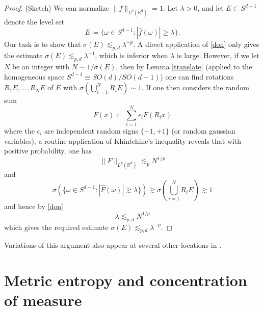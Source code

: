 \documentclass[12pt,a4paper,reqno]{amsart}
\numberwithin{equation}{section}
\theoremstyle{plain}
\theoremstyle{definition}
\newcommand\R{\mathbb{R}}
\begin{document}
\begin{proof}  (Sketch) We can normalize $\|f\|_{L^p(\R^d)}=1$.  Let $\lambda > 0$, and let $E \subset S^{d-1}$ denote the level set
$$ E \coloneqq  \{ \omega \in S^{d-1}: |\hat f(\omega)| \geq \lambda \}.$$
Our task is to show that $\sigma(E) \lesssim_{p,d} \lambda^{-p}$.  A direct application of \eqref{don} only gives the estimate $\sigma(E) \lesssim_{p,d} \lambda^{-1}$, which is inferior when $\lambda$ is large.  However, if we let $N$ be an integer with $N \sim 1/\sigma(E)$, then by Lemma \ref{translate} (applied to the homogeneous space $S^{d-1} \equiv SO(d)/SO(d-1)$) one can find rotations $R_1 E, \dots, R_N E$ of $E$ with $\sigma(\bigcup_{i=1}^N R_i E) \sim 1$.  If one then considers the random sum
$$ F(x) \coloneqq  \sum_{i=1}^N \epsilon_i F(R_i x)$$
where the $\epsilon_i$ are independent random signs $\{-1,+1\}$ (or random gaussian variables), a routine application of Khintchine's inequality reveals that with positive probability, one has
$$ \|F\|_{L^p(\R^d)} \lesssim_p N^{1/p}$$
and
$$ \sigma(\{ \omega \in S^{d-1}: |\hat F(\omega)| \gtrsim \lambda \}) \gtrsim \sigma(\bigcup_{i=1}^N R_i E) \gtrsim 1$$
and hence by \eqref{don}
$$ \lambda \lesssim_{p,d} N^{1/p}$$
which gives the required estimate $\sigma(E) \lesssim_{p,d} \lambda^{-p}$.
\end{proof}

Variations of this argument also appear at several other locations in \cite{besicovitch}.

\section{Metric entropy and concentration of measure}\label{entropy-sec}
\end{document}
